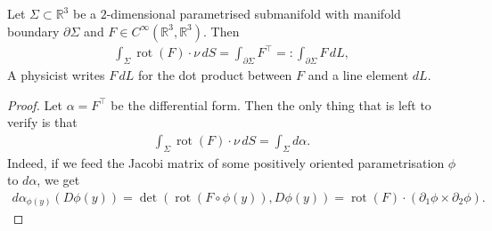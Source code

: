 \begin{theorem}\label{thm:stokes-3}
	Let $ \Sigma \subset \mathbb{R}^{3}$ be a $2$-dimensional parametrised submanifold with manifold boundary $\partial \Sigma$ and $F \in C^{\infty}(\mathbb{R}^{3}, \mathbb{R}^{3})$. Then
	\begin{align*}
		\int_{\Sigma } \operatorname{rot} (F) \cdot \nu \, dS = \int_{\partial \Sigma } F^\top =: \int_{\partial \Sigma } F \, dL,
	\end{align*}
	A physicist writes $F \, dL$ for the dot product between $F$ and a line element $dL$.
\end{theorem}
\begin{proof}
	Let $\alpha = F^\top $ be the differential form. Then the only thing that is left to verify is that
	\begin{align*}
		\int_{\Sigma } \operatorname{rot} (F) \cdot \nu \, dS = \int_{\Sigma } d\alpha.
	\end{align*}
	Indeed, if we feed the Jacobi matrix of some positively oriented parametrisation $\phi$ to $d\alpha $, we get
	\begin{align*}
		d\alpha_{\phi(y)} (D \phi(y)) = \det ( \operatorname{rot} (F \circ \phi(y)), D\phi(y)) = \operatorname{rot} (F) \cdot (\partial_{1} \phi \times \partial_{2}\phi).
	\end{align*}
\end{proof}


